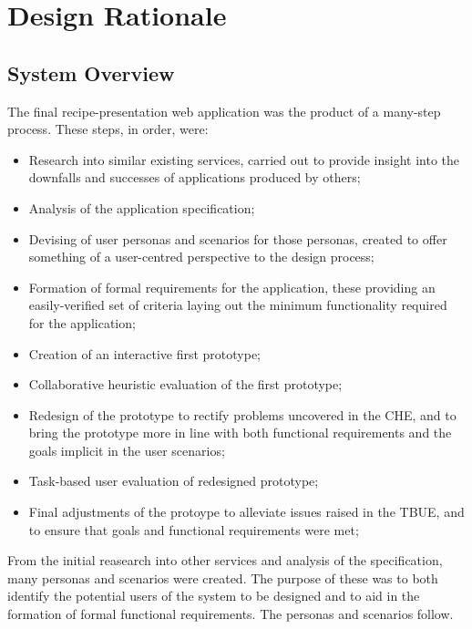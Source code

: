 \section{Design Rationale}

\subsection{System Overview}
The final recipe-presentation web application was the product of a many-step process. These steps, in order, were:
\begin{itemize}
  \item Research into similar existing services, carried out to provide insight into the downfalls and successes of applications produced by others;
  \item Analysis of the application specification;
  \item Devising of user personas and scenarios for those personas, created to offer something of a user-centred perspective to the design process;
  \item Formation of formal requirements for the application, these providing an easily-verified set of criteria laying out the minimum functionality required for the application;
  \item Creation of an interactive first prototype;
  \item Collaborative heuristic evaluation of the first prototype;
  \item Redesign of the prototype to rectify problems uncovered in the CHE, and to bring the prototype more in line with both functional requirements and the goals implicit in the user scenarios;
  \item Task-based user evaluation of redesigned prototype;
  \item Final adjustments of the protoype to alleviate issues raised in the TBUE, and to ensure that goals and functional requirements were met;
\end{itemize}

From the initial reasearch into other services and analysis of the specification, many personas and scenarios were created. The purpose of these was to both identify the potential users of the system to be designed and to aid in the formation of formal functional requirements. The personas and scenarios follow.


